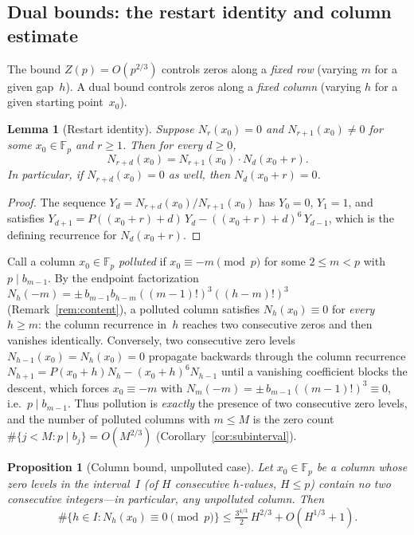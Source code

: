 \documentclass[11pt]{article}
\newtheorem{lemma}[theorem]{Lemma}
\newtheorem{proposition}[theorem]{Proposition}
\theoremstyle{definition}
\theoremstyle{remark}
\begin{document}
\subsection{Dual bounds: the restart identity and column estimate}

The bound $Z(p) = O(p^{2/3})$ controls zeros along a \emph{fixed row}
(varying $m$ for a given gap~$h$).
A dual bound controls zeros along a \emph{fixed column}
(varying $h$ for a given starting point~$x_0$).

\begin{lemma}[Restart identity]\label{lem:restart}
Suppose $N_r(x_0) = 0$ and $N_{r+1}(x_0) \ne 0$
for some $x_0 \in \mathbb{F}_p$ and $r \ge 1$.
Then for every $d \ge 0$,
\begin{equation}\label{eq:restart}
N_{r+d}(x_0) = N_{r+1}(x_0) \cdot N_d(x_0 + r).
\end{equation}
In particular, if $N_{r+d}(x_0) = 0$ as well,
then $N_d(x_0 + r) = 0$.
\end{lemma}

\begin{proof}
The sequence $Y_d = N_{r+d}(x_0)/N_{r+1}(x_0)$ has
$Y_0 = 0$, $Y_1 = 1$, and satisfies
$Y_{d+1} = P((x_0{+}r){+}d)\,Y_d - ((x_0{+}r){+}d)^6\,Y_{d-1}$,
which is the defining recurrence for $N_d(x_0 + r)$.
\end{proof}

Call a column $x_0 \in \mathbb{F}_p$ \emph{polluted} if
$x_0 \equiv -m \pmod p$ for some $2 \le m < p$ with
$p \mid b_{m-1}$.
By the endpoint factorization
$N_h(-m) = \pm\, b_{m-1} b_{h-m}
((m{-}1)!)^3((h{-}m)!)^3$
(Remark~\ref{rem:content}), a polluted column satisfies
$N_h(x_0) \equiv 0$ for \emph{every} $h \ge m$: the
column recurrence in~$h$ reaches two consecutive zeros
and then vanishes identically.
Conversely, two consecutive zero levels
$N_{h-1}(x_0) = N_h(x_0) = 0$ propagate backwards
through the column recurrence
$N_{h+1} = P(x_0{+}h)N_h - (x_0{+}h)^6 N_{h-1}$
until a vanishing coefficient blocks the descent, which
forces $x_0 \equiv -m$ with $N_m(-m) = \pm\,
b_{m-1}((m{-}1)!)^3 \equiv 0$, i.e.\ $p \mid b_{m-1}$.
Thus pollution is \emph{exactly} the presence of two
consecutive zero levels, and the number of polluted
columns with $m \le M$ is the zero count
$\#\{j < M : p \mid b_j\} = O(M^{2/3})$
(Corollary~\ref{cor:subinterval}).

\begin{proposition}[Column bound, unpolluted case]
\label{prop:column}
Let $x_0 \in \mathbb{F}_p$ be a column whose zero levels
in the interval~$I$ (of $H$ consecutive $h$-values,
$H \le p$) contain no two consecutive integers---in
particular, any unpolluted column.  Then
\begin{equation}\label{eq:column-bound}
\#\{h \in I : N_h(x_0) \equiv 0 \pmod{p}\}
\le \tfrac{3^{4/3}}{2}\,H^{2/3} + O(H^{1/3} + 1).
\end{equation}
\end{proposition}
\end{document}
